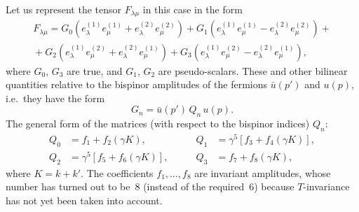 Let us represent the tensor $F_{\lambda\mu}$ in this case in the form
\begin{equation}
\begin{split}
F_{\lambda\mu} = G_0(e^{(1)}_\lambda e^{(1)}_\mu + e^{(2)}_\lambda e^{(2)}_\mu) + G_1(e^{(1)}_\lambda e^{(1)}_\mu - e^{(2)}_\lambda e^{(2)}_\mu) +{}\\[4pt]
{}+ G_2(e^{(1)}_\lambda e^{(2)}_\mu + e^{(2)}_\lambda e^{(1)}_\mu) + G_3(e^{(1)}_\lambda e^{(2)}_\mu - e^{(2)}_\lambda e^{(1)}_\mu),
\end{split}
\tag{70.11}
\end{equation}
where $G_0$, $G_3$ are true, and $G_1$, $G_2$ are pseudo-scalars. These and other bilinear quantities relative to the bispinor amplitudes of the fermions $\bar{u}(p')$ and $u(p)$, i.e.\ they have the form
\begin{equation}
G_n = \bar{u}(p')\,Q_n\,u(p).
\tag{70.12}
\end{equation}
The general form of the matrices (with respect to the bispinor indices) $Q_n$:
\begin{equation}
\begin{aligned}
Q_0 &= f_1 + f_2(\gamma K),\qquad & Q_1 &= \gamma^5[f_3 + f_4(\gamma K)],\\[3pt]
Q_2 &= \gamma^5[f_5 + f_6(\gamma K)],\qquad & Q_3 &= f_7 + f_8(\gamma K),
\end{aligned}
\tag{70.13}
\end{equation}
where $K = k + k'$. The coefficients $f_1, \ldots, f_8$ are invariant amplitudes, whose number has turned out to be~8 (instead of the required~6) because $T$-invariance has not yet been taken into account.

